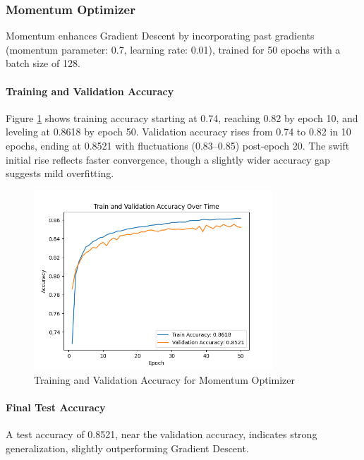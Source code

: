 \documentclass{article}
\begin{document}
\subsubsection{Momentum Optimizer}

Momentum enhances Gradient Descent by incorporating past gradients (momentum parameter: 0.7, learning rate: 0.01), trained for 50 epochs with a batch size of 128.

\paragraph{Training and Validation Accuracy}

Figure \ref{fig:momentum_accuracy} shows training accuracy starting at 0.74, reaching 0.82 by epoch 10, and leveling at 0.8618 by epoch 50. Validation accuracy rises from 0.74 to 0.82 in 10 epochs, ending at 0.8521 with fluctuations (0.83–0.85) post-epoch 20. The swift initial rise reflects faster convergence, though a slightly wider accuracy gap suggests mild overfitting.

\begin{figure}[H]
    \centering
    \includegraphics[width=0.8\textwidth]{assets/q2/momentum/accuracy_50_epochs.png}
    \caption{Training and Validation Accuracy for Momentum Optimizer}
    \label{fig:momentum_accuracy}
\end{figure}

\paragraph{Final Test Accuracy}

A test accuracy of 0.8521, near the validation accuracy, indicates strong generalization, slightly outperforming Gradient Descent.
\end{document}
